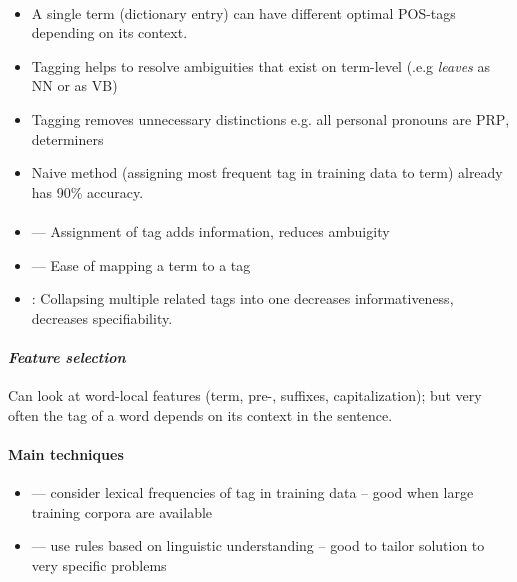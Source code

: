 \documentclass[10pt,twocolumn]{article}
\begin{document}
\paragraph{}
\begin{itemize}
\item A single term (dictionary entry) can have different optimal POS-tags
  depending on its context.
\item Tagging helps to resolve ambiguities that exist on term-level (.e.g
  \textit{leaves} as \textsc{NN} or as \textsc{VB})
\item Tagging removes unnecessary distinctions e.g. all personal pronouns are
  \textsc{PRP}, determiners
\item Naive method (assigning most frequent tag in training data to term)
  already has 90\% accuracy.
\end{itemize}

\paragraph{}
\begin{itemize}
\item \textbf{} --- Assignment of tag adds information,
  reduces ambuigity
\item \textbf{} --- Ease of mapping a term to a tag
\item {}: Collapsing multiple related tags into one decreases
  informativeness, decreases specifiability.
\end{itemize}

\paragraph{\textit{Feature selection}} Can look at word-local features (term,
pre-, suffixes, capitalization); but very often the tag of a word depends on its
context in the sentence.

\paragraph{\textbf{Main techniques}}
\begin{itemize}
\item {} --- consider lexical frequencies of tag in
  training data -- good when large training corpora are available
\item {} --- use rules based on linguistic understanding
  -- good to tailor solution to very specific problems
\end{itemize}
\end{document}
